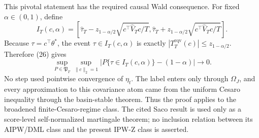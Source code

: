 This pivotal statement has the required causal Wald consequence. For fixed \(\alpha\in(0,1)\), define
\[
 I_T(c,\alpha)=\left[
 \widehat\tau_T-z_{1-\alpha/2}\sqrt{c^\top\widehat V_Tc/T},
 \widehat\tau_T+z_{1-\alpha/2}\sqrt{c^\top\widehat V_Tc/T}
 \right].
\]
Because \(\tau=c^\top\theta^*\), the event \(\tau\in I_T(c,\alpha)\) is exactly \(|T_T^{\mathrm{rqv}}(c)|\le z_{1-\alpha/2}\). Therefore (26) gives
\[
 \sup_{P\in\mathfrak P_T}\sup_{\|c\|_2=1}
 \left|P\{\tau\in I_T(c,\alpha)\}-(1-\alpha)\right|
 \longrightarrow0. \tag{27}
\]
No step used pointwise convergence of \(\eta_t\). The label enters only through \(\Omega_J\), and every approximation to this covariance atom came from the uniform Cesaro inequality through the basin-stable theorem. Thus the proof applies to the broadened finite-Cesaro-regime class. The cited Saco result is used only as a score-level self-normalized martingale theorem; no inclusion relation between its AIPW/DML class and the present IPW-Z class is asserted.